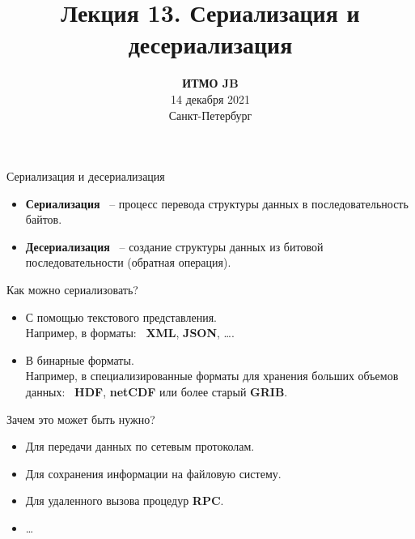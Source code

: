 \documentclass{beamer}
\title{Лекция 13. Сериализация и десериализация}
\date{
   \textbf{ИТМО JB}\\
   14 декабря 2021 \\
   Санкт-Петербург
}
\begin{document}
\begin{frame} 
  \titlepage
\end{frame}

\begin{frame}[fragile]{Сериализация и десериализация}
    \begin{itemize}
        \item {\bf Сериализация} ~-- процесс перевода структуры данных в последовательность байтов.
        \item {\bf Десериализация} ~-- создание структуры данных из битовой последовательности (обратная операция).
    \end{itemize}
\end{frame}

\begin{frame}[fragile]{Как можно сериализовать?}
    \begin{itemize}
        \item С помощью текстового представления. \\Например, в форматы: ~{\bf XML}, {\bf JSON}, \dots.
        \item В бинарные форматы. \\Например, в специализированные форматы для хранения больших объемов данных: ~{\bf HDF}, {\bf netCDF} или более старый {\bf GRIB}.
    \end{itemize}
\end{frame}

\begin{frame}[fragile]{Зачем это может быть нужно?}
    \begin{itemize}
        \item Для передачи данных по сетевым протоколам.
        \item Для сохранения информации на файловую систему.
        \item Для удаленного вызова процедур {\bf RPC}.
        \item \dots
    \end{itemize}
\end{frame}
\end{document}
